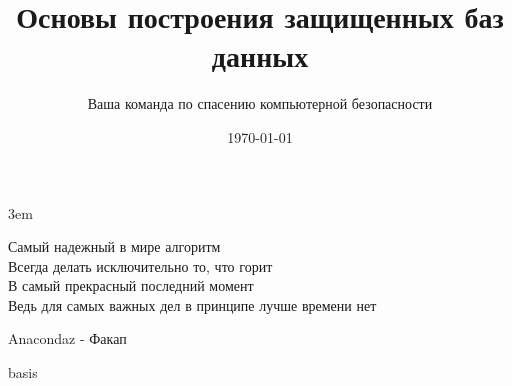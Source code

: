 \documentclass[a4paper,10pt]{article}
\title{Основы построения защищенных баз данных}
\author{Ваша команда по спасению компьютерной безопасности}
\date{\today}
\begin{document}
\emergencystretch 3em %
\maketitle
\epigraph{
	Самый надежный в мире алгоритм \\
	Всегда делать исключительно то, что горит \\
	В самый прекрасный последний момент \\
	Ведь для самых важных дел в принципе лучше времени нет
}{Anacondaz - Факап}

\newpage
\tableofcontents
\newpage

\renewcommand{\labelenumii}{\arabic{enumi}.\arabic{enumii}}
\renewcommand{\labelenumiii}{\arabic{enumi}.\arabic{enumii}.\arabic{enumiii}}
\renewcommand{\labelenumiv}
{\arabic{enumi}.\arabic{enumii}.\arabic{enumiii}.\arabic{enumiv}}


{basis}

\newpage

\newpage

\newpage

\newpage

\newpage

\newpage

% 
\newpage
\printbibliography
\end{document}
